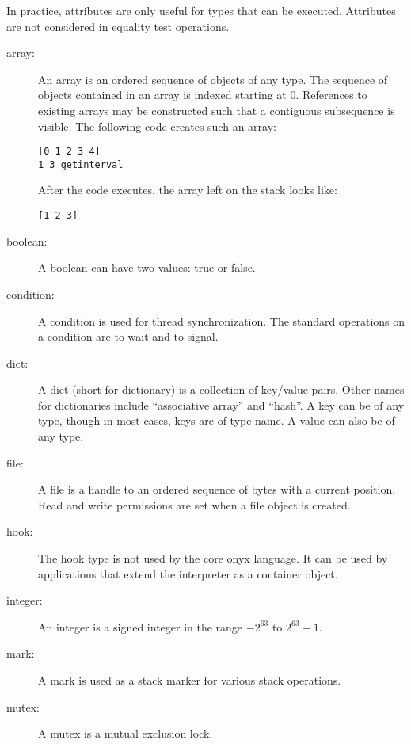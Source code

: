 In practice, attributes are only useful for types that can be executed.
Attributes are not considered in equality test operations.

\begin{description}

\item[array: ] An array is an ordered sequence of objects of any type.  The
sequence of objects contained in an array is indexed starting at 0.  References
to existing arrays may be constructed such that a contiguous subsequence is
visible.  The following code creates such an array:

\begin{verbatim}
[0 1 2 3 4]
1 3 getinterval
\end{verbatim}

After the code executes, the array left on the stack looks like:

\begin{verbatim}
[1 2 3]
\end{verbatim}

\item[boolean: ] A boolean can have two values: true or false.

\item[condition: ] A condition is used for thread synchronization.  The standard
operations on a condition are to wait and to signal.

\item[dict: ] A dict (short for dictionary) is a collection of key/value pairs.
Other names for dictionaries include ``associative array'' and ``hash''.  A key
can be of any type, though in most cases, keys are of type name.  A value can
also be of any type.

\item[file: ] A file is a handle to an ordered sequence of bytes with a current
position.  Read and write permissions are set when a file object is created.

\item[hook: ] The hook type is not used by the core onyx language.  It can be
used by applications that extend the interpreter as a container object.

\item[integer: ] An integer is a signed integer in the range $-2^{63}$ to
$2^{63} - 1$.

\item[mark: ] A mark is used as a stack marker for various stack operations.

\item[mutex: ] A mutex is a mutual exclusion lock.


\end{description}

